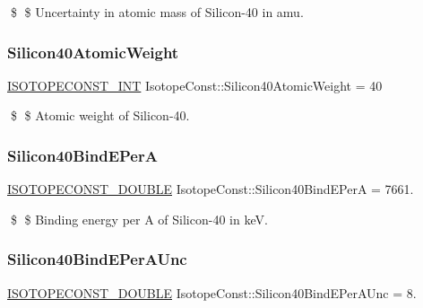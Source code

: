 \$ \$ Uncertainty in atomic mass of Silicon-\/40 in amu. \mbox{\label{group___isotope_const-_silicon-_si40_ga150f087ebbda82c48b01b349cdbffc56}} 
\subsubsection{\texorpdfstring{Silicon40\+Atomic\+Weight}{Silicon40AtomicWeight}}
{\footnotesize\ttfamily \mbox{\hyperlink{group___isotope_const-_macros_ga5f18360b3e99483a35c32d789e62621c}{I\+S\+O\+T\+O\+P\+E\+C\+O\+N\+S\+T\+\_\+\+I\+NT}} Isotope\+Const\+::\+Silicon40\+Atomic\+Weight = 40}

\$ \$ Atomic weight of Silicon-\/40. \mbox{\label{group___isotope_const-_silicon-_si40_ga9c6c0c7c670f68eefabf58fa589b5478}} 
\subsubsection{\texorpdfstring{Silicon40\+Bind\+E\+PerA}{Silicon40BindEPerA}}
{\footnotesize\ttfamily \mbox{\hyperlink{group___isotope_const-_macros_ga8f45a7272ce02c0b4c65c44636ed719a}{I\+S\+O\+T\+O\+P\+E\+C\+O\+N\+S\+T\+\_\+\+D\+O\+U\+B\+LE}} Isotope\+Const\+::\+Silicon40\+Bind\+E\+PerA = 7661.}

\$ \$ Binding energy per A of Silicon-\/40 in keV. \mbox{\label{group___isotope_const-_silicon-_si40_ga55f44e73886d577de7f270f0927a429d}} 
\subsubsection{\texorpdfstring{Silicon40\+Bind\+E\+Per\+A\+Unc}{Silicon40BindEPerAUnc}}
{\footnotesize\ttfamily \mbox{\hyperlink{group___isotope_const-_macros_ga8f45a7272ce02c0b4c65c44636ed719a}{I\+S\+O\+T\+O\+P\+E\+C\+O\+N\+S\+T\+\_\+\+D\+O\+U\+B\+LE}} Isotope\+Const\+::\+Silicon40\+Bind\+E\+Per\+A\+Unc = 8.}

